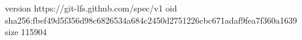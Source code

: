 version https://git-lfs.github.com/spec/v1
oid sha256:fbef49d5f356d98c6826534a684c2450d2751226cbc671adaf9fea7f360a1639
size 115904
